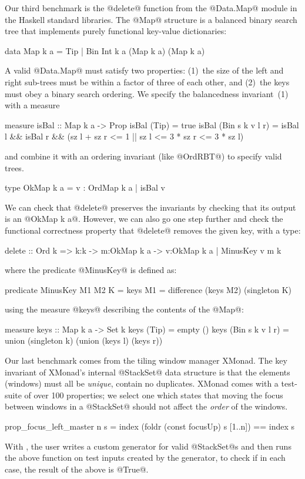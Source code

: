 \label{sec:delete-from-map}
%
Our third benchmark is the @delete@ function from the \hbox{@Data.Map@} module in 
the Haskell standard libraries. The @Map@ structure is a balanced binary
search tree that implements purely functional key-value dictionaries:
%
\begin{code}
  data Map k a = Tip | Bin Int k a (Map k a) (Map k a)
\end{code}
%
A valid @Data.Map@ must satisfy two properties:
%
(1)~the size of the left and right sub-trees must be 
    within a factor of three of each other, and
(2)~the keys must obey a binary search ordering.
%
We specify the balancedness invariant~(1) with a measure
%
\begin{code}
  measure isBal :: Map k a -> Prop
  isBal (Tip)           = true
  isBal (Bin s k v l r) = isBal l && isBal r &&
                          (sz l + sz r <= 1 ||
                           sz l <= 3 * sz r <= 3 * sz l)
\end{code}
%
and combine it with an ordering invariant (like @OrdRBT@) to specify valid trees.
%
\begin{code}
  type OkMap k a = {v : OrdMap k a | isBal v}
\end{code}
%
We can check that @delete@ preserves the invariants by 
checking that its output is an @OkMap k a@.
However, we can also go one step further and check 
the functional correctness property that @delete@ 
removes the given key, with a type:
%
\begin{code}
  delete :: Ord k => k:k -> m:OkMap k a 
         -> {v:OkMap k a | MinusKey v m k}
\end{code}
%
where the predicate @MinusKey@ is defined as:
%
\begin{code}
  predicate MinusKey M1 M2 K 
    = keys M1 = difference (keys M2) (singleton K)
\end{code}
%
using the measure @keys@ describing the contents of the @Map@:
%
\begin{code}
  measure keys :: Map k a -> Set k
  keys (Tip)           = empty () 
  keys (Bin s k v l r) = union (singleton k) 
                               (union (keys l) (keys r))
\end{code}

 \label{sec:refocus-stackset}
%
Our last benchmark comes from the tiling window manager XMonad. 
%
The key invariant of XMonad's internal @StackSet@ data structure 
is that the elements (windows) must all be \emph{unique}, \ie contain
no duplicates.
%
XMonad comes with a test-suite of over 100 \quickcheck properties;
we select one which states that moving the focus between windows 
in a @StackSet@ should not affect the \emph{order} of the windows.
%
\begin{code}
  prop_focus_left_master n s =
    index (foldr (const focusUp) s [1..n]) == index s
\end{code}
%
With \quickcheck, the user writes a custom generator for valid @StackSet@s
and then runs the above function on test inputs created by the generator, 
to check if in each case, the result of the above is @True@.

